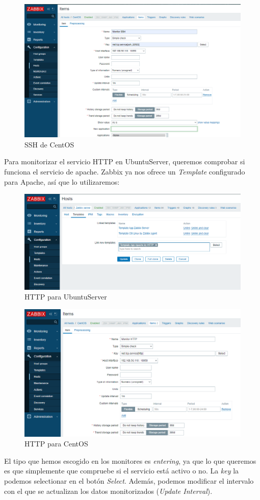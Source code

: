 \documentclass[a4paper]{article}
\begin{document}
\newpage
\begin{figure}
    \caption{SSH de CentOS}
    \includegraphics[width=\textwidth]{monitor ssh centos.png}
\end{figure}
Para monitorizar el servicio HTTP en UbuntuServer, queremos comprobar si funciona el servicio de apache.
Zabbix ya nos ofrece un \textsl{Template} configurado para Apache, así que lo utilizaremos:
\begin{figure}[hbt!]
    \caption{HTTP para UbuntuServer}
    \includegraphics[width=\textwidth]{http para ubunut.png}
\end{figure}
\newpage
\begin{figure}[]
    \caption{HTTP para CentOS}
    \includegraphics[width=\textwidth]{http centos.png}
\end{figure}
El tipo que hemos escogido en los monitores es \textsl{entering}, ya que lo que queremos es que simplemente
que compruebe si el servicio está activo o no. La \textsl{key} la podemos selectionar en el botón \textsl{Select}.
Además, podemos modificar el intervalo con el que se actualizan los datos monitorizados 
(\textsl{Update Interval}).
\end{document}
